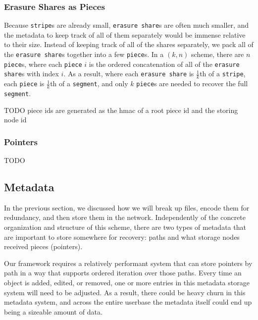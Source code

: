 \documentclass[a4paper,10pt]{article} \usepackage[utf8]{inputenc}
\newcommand{\x}[1]{{\tt #1}} \newcommand{\code}[1]{{\tt #1}}
\newcommand{\todo}[1]{{\color{red} TODO #1 }}
\begin{document}
\subsubsection{Erasure Shares as Pieces}

Because \x{stripe}s are already small, \x{erasure share}s are often much
smaller, and the metadata to keep track of all of them separately would be
immense relative to their size. Instead of keeping track of all of the shares
separately, we pack all of the \x{erasure share}s together into a few
\x{piece}s. In a $(k, n)$ scheme, there are $n$ \x{piece}s, where each
\x{piece} $i$ is the ordered concatenation of all of the \x{erasure share}s with
index $i$. As a result, where each \x{erasure share} is $\frac{1}{k}$th of a
\x{stripe}, each \x{piece} is $\frac{1}{k}$th of a \x{segment}, and only $k$
\x{piece}s are needed to recover the full \x{segment}.

\todo{piece ids are generated as the hmac of a root piece id and the storing
node id}

\subsubsection{Pointers}

\todo{}

\subsection{Metadata}

In the previous section, we discussed how we will break up files, encode them
for redundancy, and then store them in the network. Independently of the
concrete organization and structure of this scheme, there are two types of
metadata that are important to store somewhere for recovery: paths and what
storage nodes received pieces (pointers).

Our framework requires a relatively performant system that can store pointers by
path in a way that supports ordered iteration over those paths. Every time an
object is added, edited, or removed, one or more entries in this metadata
storage system will need to be adjusted. As a result, there could be heavy churn
in this metadata system, and across the entire userbase the metadata itself
could end up being a sizeable amount of data.
\end{document}
